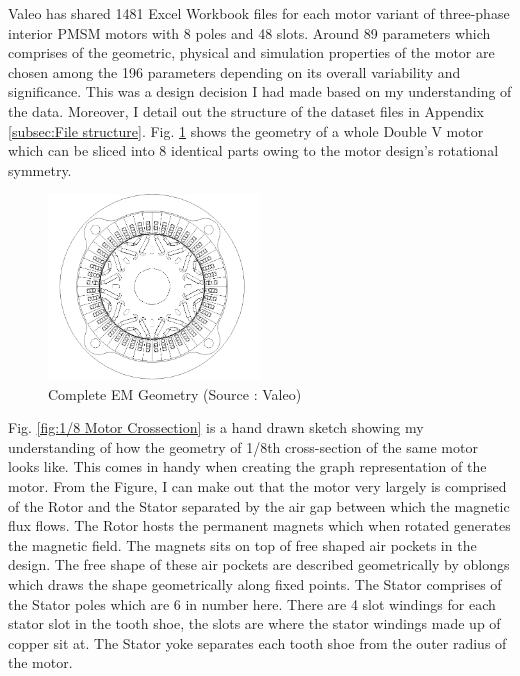 \documentclass{report} %
\begin{document}
Valeo has shared 1481 Excel Workbook files for each motor variant of three-phase interior \ac{PMSM} motors with 8 poles and 48 slots. 
Around 89 parameters which comprises of the geometric, physical and simulation properties of the motor are chosen among the 196 parameters depending on its overall variability and significance.
This was a design decision I had made based on my understanding of the data.
Moreover, I detail out the structure of the dataset files in Appendix \ref{subsec:File structure}.
Fig. \ref{fig:Full Motor} shows the geometry of a whole Double V motor which can be sliced into 8 identical parts owing to the motor design's rotational symmetry.
\begin{figure}[H]
    \centering
    \includegraphics[width=0.5\textwidth]{./ReportImages/FullMotorv2.png} 
    \caption{Complete \ac{EM} Geometry (Source : Valeo)}
    \label{fig:Full Motor}
\end{figure}

Fig. \ref{fig:1/8 Motor Crossection} is a hand drawn sketch showing my understanding of how the geometry of 1/8th cross-section of the same motor looks like.
This comes in handy when creating the graph representation of the motor.
From the Figure, I can make out that the motor very largely is comprised of the Rotor and the Stator separated by the air gap between which the magnetic flux flows.
The Rotor hosts the permanent magnets which when rotated generates the magnetic field. The magnets sits on top of free shaped air pockets in the design. 
The free shape of these air pockets are described geometrically by oblongs which draws the shape geometrically along fixed points.
The Stator comprises of the Stator poles which are 6 in number here. There are 4 slot windings for each stator slot in the tooth shoe, the slots are where the stator windings made 
up of copper sit at. The Stator yoke separates each tooth shoe from the outer radius of the motor.
\end{document}
